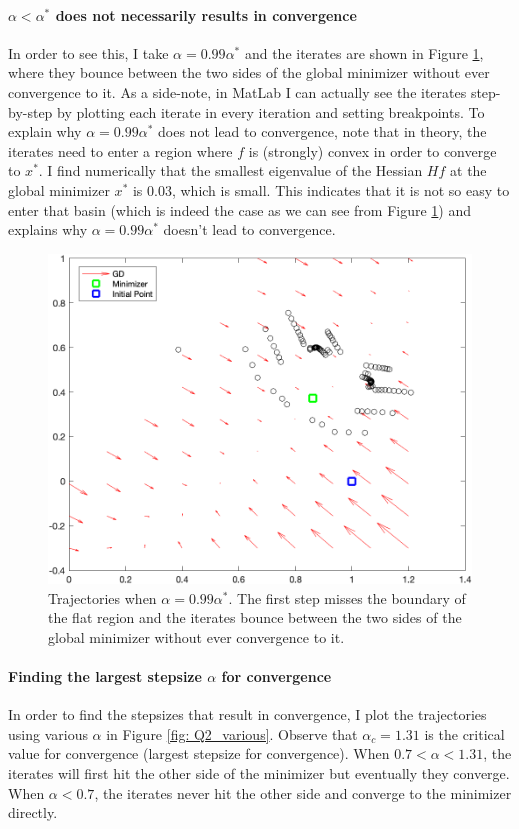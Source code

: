 \documentclass{article}
\begin{document}
\paragraph{$ \alpha < \alpha^{*}$ does not necessarily results in convergence} In order to see this, I take $ \alpha = 0.99\alpha^{*} $ and the iterates are shown in Figure \ref{fig: Q2_99}, where they bounce between the two sides of the global minimizer without ever convergence to it. As a side-note, in MatLab I can actually see the iterates step-by-step by plotting each iterate in every iteration and setting breakpoints. To explain why $ \alpha = 0.99\alpha^{*} $ does not lead to convergence, note that in theory, the iterates need to enter a region where $ f $ is (strongly) convex in order to converge to $ x^{*} $. I find numerically that the smallest eigenvalue of the Hessian $ Hf $ at the global minimizer $ x^{*} $ is $ 0.03 $, which is small. This indicates that it is not so easy to enter that basin (which is indeed the case as we can see from Figure \ref{fig: Q2_99}) and explains why  $ \alpha = 0.99\alpha^{*} $ doesn't lead to convergence.

\begin{figure}[htp]
	\centering
	\includegraphics[width=.7\linewidth]{figs/Q2_99percent.png}
	\caption{Trajectories when $ \alpha = 0.99\alpha^{*} $. The first step misses the boundary of the flat region and the iterates bounce between the two sides of the global minimizer without ever convergence to it. }
	\label{fig: Q2_99}
\end{figure}

\paragraph{Finding the largest stepsize $ \alpha $ for convergence}  In order to find the stepsizes that result in convergence, I plot the trajectories using various $ \alpha $ in Figure \ref{fig: Q2_various}. Observe that $ \alpha_c = 1.31$ is the critical value for convergence (largest stepsize for convergence). When $ 0.7<\alpha < 1.31 $, the iterates will first hit the other side of the minimizer but eventually they converge. When $ \alpha < 0.7 $, the iterates never hit the other side and converge to the minimizer directly.
\end{document}
